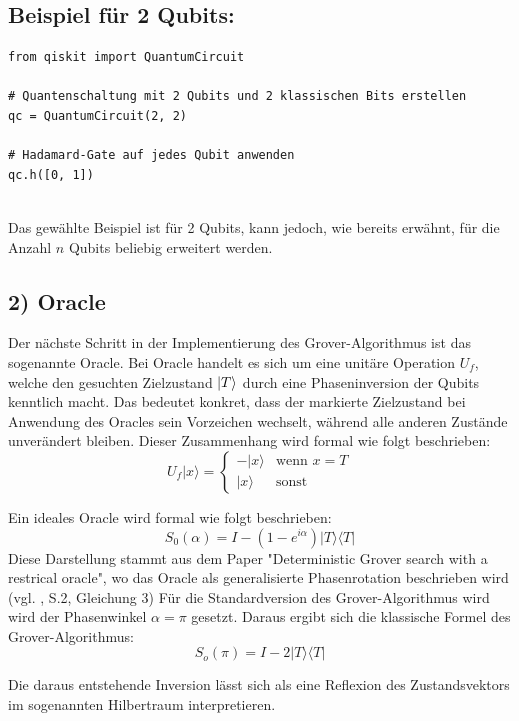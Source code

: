 \subsection*{Beispiel für 2 Qubits:}
\begin{verbatim}
from qiskit import QuantumCircuit

# Quantenschaltung mit 2 Qubits und 2 klassischen Bits erstellen
qc = QuantumCircuit(2, 2)

# Hadamard-Gate auf jedes Qubit anwenden
qc.h([0, 1])


\end{verbatim}


Das gewählte Beispiel ist für 2 Qubits, kann jedoch, wie bereits erwähnt, für die Anzahl $n$ Qubits beliebig erweitert werden.

\subsection*{2) Oracle}
Der nächste Schritt in der Implementierung des Grover-Algorithmus ist das sogenannte Oracle. Bei Oracle handelt es sich um eine unitäre Operation $U_f$, welche den gesuchten Zielzustand $\ket{T}$ durch eine Phaseninversion der Qubits kenntlich macht. Das bedeutet konkret, dass der markierte Zielzustand bei Anwendung des Oracles sein Vorzeichen wechselt, während alle anderen Zustände unverändert bleiben. Dieser Zusammenhang wird formal wie folgt beschrieben: 
$$
U_f|x\rangle = \begin{cases}
    -|x\rangle & \text{wenn } x = T \\
    |x\rangle & \text{sonst}
\end{cases}
$$

Ein ideales Oracle wird formal wie folgt beschrieben:
$$
S_0(\alpha) = I - (1 - e^{i\alpha})|T\rangle\langle T|
$$
Diese Darstellung stammt aus dem Paper "Deterministic Grover search with a restrical oracle", wo das Oracle als generalisierte Phasenrotation beschrieben wird 
(vgl. \citeauthor{roy_deterministic_2022}, \citeyear{roy_deterministic_2022} S.2, Gleichung 3)
Für die Standardversion des Grover-Algorithmus wird wird der Phasenwinkel $\alpha = \pi$ gesetzt. Daraus ergibt sich die klassische Formel des Grover-Algorithmus: 
$$
S_o(\pi) = I - 2|T\rangle\langle T|
$$

Die daraus entstehende Inversion lässt sich als eine Reflexion des Zustandsvektors im sogenannten Hilbertraum interpretieren. 



